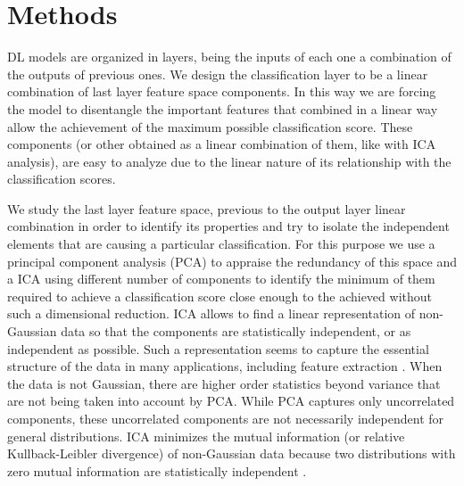 \documentclass{llncs}
\begin{document}
\section{Methods}\label{sec:methods}

DL models are organized in layers, being the inputs of each one a combination of the outputs of previous ones. We design the classification layer to be a linear combination of last layer feature space components. In this way we are forcing the model to disentangle the important features that combined in a linear way allow the achievement of the maximum possible classification score. These components (or other obtained as a linear combination of them, like with ICA analysis), are easy to analyze due to the linear nature of its relationship with the classification scores.

We study the last layer feature space, previous to the output layer linear combination in order to identify its properties and try to isolate the independent elements that are causing a particular classification. For this purpose we use a principal component analysis (PCA)  \cite{pearson1901principal} to appraise the redundancy of this space and a ICA \cite{hyvarinen2000independent} using different number of components to identify the minimum of them required to achieve a classification score close enough to the achieved without such a dimensional reduction.  ICA allows to find a linear representation of non-Gaussian data so that the components are statistically independent, or as independent as possible. Such a representation seems to capture the essential structure of the data in many applications, including feature extraction \cite{hyvarinen2000independent}. When the data is not Gaussian, there are higher order statistics beyond variance that are not being taken into account by PCA. While PCA captures only uncorrelated components, these uncorrelated components are not necessarily independent for general distributions. ICA minimizes the mutual information (or relative Kullback-Leibler divergence) of non-Gaussian data because two distributions with zero mutual information are statistically independent \cite{comon1992independent}. 
\end{document}
